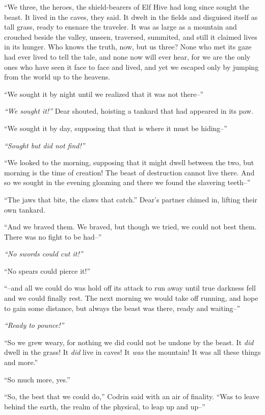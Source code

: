 ``We three, the heroes, the shield-bearers of Elf Hive had long since sought the beast. It lived in the caves, they said. It dwelt in the fields and disguised itself as tall grass, ready to ensnare the traveler. It was as large as a mountain and crouched beside the valley, unseen, traversed, summited, and still it claimed lives in its hunger. Who knows the truth, now, but us three? None who met its gaze had ever lived to tell the tale, and none now will ever hear, for we are the only ones who have seen it face to face and lived, and yet we escaped only by jumping from the world up to the heavens.

``We sought it by night until we realized that it was not there--''

\emph{``We sought it!''} Dear shouted, hoisting a tankard that had appeared in its paw.

``We sought it by day, supposing that that is where it must be hiding--''

\emph{``Sought but did not find!''}

``We looked to the morning, supposing that it might dwell between the two, but morning is the time of creation! The beast of destruction cannot live there. And so we sought in the evening gloaming and there we found the slavering teeth--''

``The jaws that bite, the claws that catch.'' Dear's partner chimed in, lifting their own tankard.

``And we braved them. We braved, but though we tried, we could not best them. There was no fight to be had--''

\emph{``No swords could cut it!''}

``No spears could pierce it!''

``--and all we could do was hold off its attack to run away until true darkness fell and we could finally rest. The next morning we would take off running, and hope to gain some distance, but always the beast was there, ready and waiting--''

\emph{``Ready to pounce!''}

``So we grew weary, for nothing we did could not be undone by the beast. It \emph{did} dwell in the grass! It \emph{did} live in caves! It \emph{was} the mountain! It was all these things and more.''

``So much more, yes.''

``So, the best that we could do,'' Codrin said with an air of finality. ``Was to leave behind the earth, the realm of the physical, to leap up and up--''

